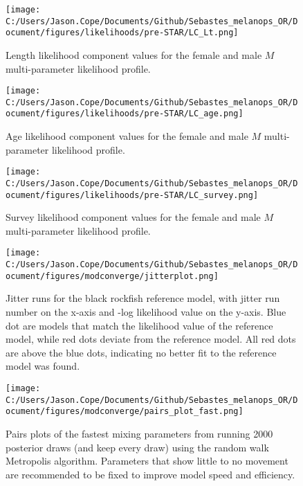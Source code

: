\documentclass[11pt,
  english,
  letterpaper,
]{article}
\begin{document}
\newpage

\begin{figure}
\centering
\texttt{[image: C:/Users/Jason.Cope/Documents/Github/Sebastes\_melanops\_OR/Document/figures/likelihoods/pre-STAR/LC\_Lt.png]}
\caption{Length likelihood component values for the female and male \(M\) multi-parameter likelihood profile.\label{fig:M-multiprofile-length-components}}
\end{figure}

\newpage

\begin{figure}
\centering
\texttt{[image: C:/Users/Jason.Cope/Documents/Github/Sebastes\_melanops\_OR/Document/figures/likelihoods/pre-STAR/LC\_age.png]}
\caption{Age likelihood component values for the female and male \(M\) multi-parameter likelihood profile.\label{fig:M-multiprofile-age-components}}
\end{figure}

\newpage

\begin{figure}
\centering
\texttt{[image: C:/Users/Jason.Cope/Documents/Github/Sebastes\_melanops\_OR/Document/figures/likelihoods/pre-STAR/LC\_survey.png]}
\caption{Survey likelihood component values for the female and male \(M\) multi-parameter likelihood profile.\label{fig:M-multiprofile-survey-components}}
\end{figure}

\newpage

\begin{figure}
\centering
\texttt{[image: C:/Users/Jason.Cope/Documents/Github/Sebastes\_melanops\_OR/Document/figures/modconverge/jitterplot.png]}
\caption{Jitter runs for the black rockfish reference model, with jitter run number on the x-axis and -log likelihood value on the y-axis. Blue dot are models that match the likelihood value of the reference model, while red dots deviate from the reference model. All red dots are above the blue dots, indicating no better fit to the reference model was found.\label{fig:jitter}}
\end{figure}

\newpage

\begin{figure}
\centering
\texttt{[image: C:/Users/Jason.Cope/Documents/Github/Sebastes\_melanops\_OR/Document/figures/modconverge/pairs\_plot\_fast.png]}
\caption{Pairs plots of the fastest mixing parameters from running 2000 posterior draws (and keep every draw) using the random walk Metropolis algorithm. Parameters that show little to no movement are recommended to be fixed to improve model speed and efficiency.\label{fig:pairs-plot-fast}}
\end{figure}
\end{document}
